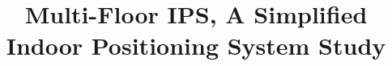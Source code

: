 \documentclass[runningheads]{llncs}
\begin{document}
%
\title{Multi-Floor IPS, A Simplified Indoor Positioning System Study}
%
%
%
%
%
\maketitle              %
%
\end{document}

